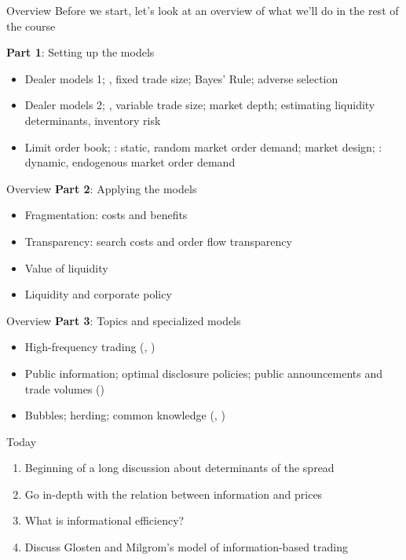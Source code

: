 \documentclass[english,10pt
,aspectratio=169
]{beamer}
\begin{document}
\begin{frame}{Overview}
	Before we start, let's look at an overview of what we'll do in the rest of the course
	
	\textbf{Part 1}: Setting up the models
	\begin{itemize}
	\item Dealer models 1; , fixed trade size; Bayes' Rule; adverse selection
	\item Dealer models 2; , variable trade size; market depth; estimating liquidity determinants, inventory risk
	\item Limit order book; : static, random market order demand; market design; : dynamic, endogenous market order demand
	\end{itemize}
\end{frame}


\begin{frame}{Overview}
\textbf{Part 2}: Applying the models
\begin{itemize}
	\item Fragmentation: costs and benefits
	\item Transparency: search costs and order flow transparency
	\item Value of liquidity
	\item Liquidity and corporate policy
\end{itemize}
\end{frame}


\begin{frame}{Overview}
\textbf{Part 3}: Topics and specialized models
\begin{itemize}
	\item High-frequency trading (, )
	\item Public information; optimal disclosure policies; public announcements and trade volumes ()
	\item Bubbles; herding; common knowledge (, )
\end{itemize}
\end{frame}


\begin{frame}{Today}
\begin{enumerate}
	\item Beginning of a long discussion about determinants of the spread
	\item Go in-depth with the relation between information and prices
	\item What is informational efficiency?
	\item Discuss Glosten and Milgrom's model of information-based trading
\end{enumerate}
\end{frame}
\end{document}

